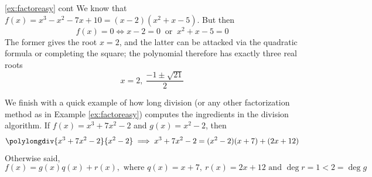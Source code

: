 

\begin{example*}{\ref{ex:factoreasy} cont}{}
	We know that $f(x)=x^3-x^2-7x+10=(x-2)(x^2+x-5)$. But then
	\[
		f(x)=0\iff x-2=0\ \text{ or }\ x^2+x-5=0
	\]
	The former gives the root $x=2$, and the latter can be attacked via the quadratic formula or completing the square; the polynomial therefore has exactly three real roots
	\[
		x=2,\ \frac{-1\pm\sqrt{21}}2
	\] 
\end{example*}


\begin{example}{}{}
	We finish with a quick example of how long division (or any other factorization method as in Example \ref{ex:factoreasy}) computes the ingredients in the division algorithm.\smallbreak
	If $f(x)=x^3+7x^2-2$ and $g(x)=x^2-2$, then
	\[
		\polylongdiv{x^3+7x^2-2}{x^2-2}
		\implies x^3+7x^2-2=(x^2-2)(x+7)+(2x+12)
	\]
	Otherwise said,
	\[
		f(x)=g(x)q(x)+r(x),
		\text{ where } q(x)=x+7, \ r(x)=2x+12\text{ and }\deg r=1<2=\deg g
	\]
\end{example}


\vfil


